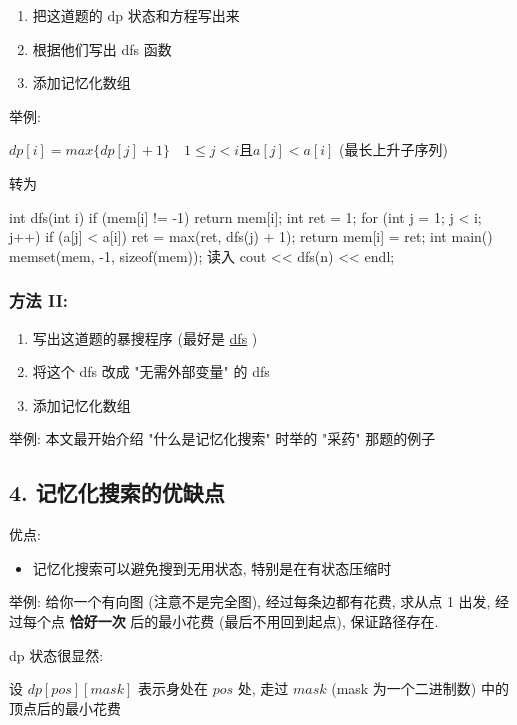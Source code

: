 \begin{enumerate}
\item 把这道题的 dp 状态和方程写出来
\item 根据他们写出 dfs 函数
\item 添加记忆化数组
\end{enumerate}

举例:

$dp[i] = max\{dp[j]+1\}\quad 1 \leq j < i \text{且}a[j]<a[i]$  (最长上升子序列)

转为

\begin{cppcode}
int dfs(int i) {
  if (mem[i] != -1) return mem[i];
  int ret = 1;
  for (int j = 1; j < i; j++)
    if (a[j] < a[i]) ret = max(ret, dfs(j) + 1);
  return mem[i] = ret;
}
int main() {
  memset(mem, -1, sizeof(mem));
  读入
  cout << dfs(n) << endl;
}
\end{cppcode}

\subsubsection{方法 II:}

\begin{enumerate}
\item 写出这道题的暴搜程序 (最好是 \href{/search/dfs}{dfs} )
\item 将这个 dfs 改成 "无需外部变量" 的 dfs
\item 添加记忆化数组
\end{enumerate}

举例: 本文最开始介绍 "什么是记忆化搜索" 时举的 "采药" 那题的例子

\hr

\subsection{4. 记忆化搜索的优缺点}

优点:

\begin{itemize}
\item 记忆化搜索可以避免搜到无用状态, 特别是在有状态压缩时
\end{itemize}

举例: 给你一个有向图 (注意不是完全图), 经过每条边都有花费, 求从点 1 出发, 经过每个点 \textbf{ 恰好一次 } 后的最小花费 (最后不用回到起点), 保证路径存在.

dp 状态很显然:

设 $dp[pos][mask]$ 表示身处在 $pos$ 处, 走过 $mask$ (mask 为一个二进制数) 中的顶点后的最小花费

